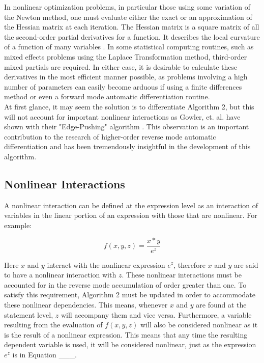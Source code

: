 \documentclass[oneside]{article}
\begin{document}
In nonlinear optimization problems, in particular those using some variation of the Newton method, one must evaluate either the exact or an approximation of the Hessian matrix at each iteration. The Hessian matrix is a square matrix of all the second-order partial derivatives for a function. It describes the local curvature of a function of many variables \cite{wiki_hessian}. In some statistical computing routines, such as mixed effects problems using the Laplace Transformation method, third-order mixed partials are required. In either case, it is desirable to calculate these derivatives in the most efficient manner possible, as problems involving a high number of parameters can easily become arduous if using a finite differences method or even a forward mode automatic differentiation routine. \\
At first glance, it may seem the solution is to differentiate Algorithm 2, but this will not account for important nonlinear interactions as Gowler, et. al. have shown with their "Edge-Pushing" algorithm \cite{gowler_ep}. This observation is an important contribution to the research of higher-order reverse mode automatic differentiation and has been tremendously insightful in the development of this algorithm.

\subsection{Nonlinear Interactions}
A nonlinear interaction can be defined at the expression level as an interaction of variables in the linear portion of an expression with those that are nonlinear. For example:

\begin{equation}
 f(x,y,z) = \frac{x*y}{e^z}
\end{equation}

Here $x$ and $y$ interact with the nonlinear expression $e^{z}$, therefore $x$ and $y$ are said to have a nonlinear interaction with $z$. These nonlinear interactions must be accounted for in the reverse mode accumulation of order greater than one. To satisfy this requirement, Algorithm 2 must be updated in order to accommodate these nonlinear dependencies. This means, whenever $x$ and $y$ are found at the statement level, $z$ will accompany them and vice versa. Furthermore, a variable resulting from the evaluation of $f(x,y,z)$ will also be considered nonlinear as it is the result of a nonlinear expression. This means that any time the resulting dependent variable is used, it will be considered nonlinear, just as the expression $e^{z}$ is in Equation ___.
\end{document}
